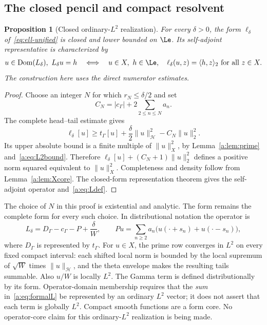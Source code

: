 \documentclass[11pt,a4paper]{article}
\numberwithin{equation}{section}
\newtheorem{proposition}[theorem]{Proposition}
\theoremstyle{definition}\newtheorem{definition}[theorem]{Definition}
\theoremstyle{remark}\newtheorem{remark}[theorem]{Remark}
\newcommand{\Hh}{\mathcal H}\newcommand{\Hw}{\mathcal H}
\newcommand{\tg}{t_\Gamma}\newcommand{\cg}{c_\Gamma}
\newcommand{\dom}{\operatorname{Dom}}\newcommand{\Var}{\operatorname{Var}}
\newcommand{\ip}[2]{\langle#1,#2\rangle}\newcommand{\norm}[1]{\lVert#1\rVert}\newcommand{\abs}[1]{\lvert#1\rvert}
\begin{document}
\subsection{The closed pencil and compact resolvent}\label{a:sec:pencil}

\begin{proposition}[Closed ordinary-$L^2$ realization]\label{a:prop:closedpencil}
For every $\delta>0$, the form $\ell_\delta$ of~\eqref{eq:ell-unified} is closed and lower bounded on $\Le$. Its self-adjoint representative is characterized by
\begin{equation}\label{a:eq:Ldef}
 \begin{split}
 u\in\dom(L_\delta),\ L_\delta u=h\quad\Longleftrightarrow\quad
 u\in X,\ h\in\Le,\quad
 \ell_\delta(u,z)=\ip{h}{z}_2\ \text{for all }z\in X.
 \end{split}
\end{equation}
The construction here uses the direct numerator estimates.
\end{proposition}
\begin{proof}
Choose an integer $N$ for which $r_N\le\delta/2$ and set
\[
 C_N=|\cg|+2\sum_{2\le n\le N}a_n.
\]
The complete head--tail estimate gives
\begin{equation}\label{a:eq:coercive}
 \ell_\delta[u]\ge\tg[u]+\frac\delta2\norm{u}_{\Hh}^2-C_N\norm{u}_2^2.
\end{equation}
Its upper absolute bound is a finite multiple of $\norm{u}_X^2$, by Lemma~\ref{a:lem:prime} and~\eqref{a:eq:L2bound}. Therefore
$\ell_\delta[u]+(C_N+1)\norm{u}_2^2$ defines a positive norm squared equivalent to $\norm{u}_X^2$. Completeness and density follow from Lemma~\ref{a:lem:Xcore}. The closed-form representation theorem gives the self-adjoint operator and~\eqref{a:eq:Ldef}.
\end{proof}

The choice of $N$ in this proof is existential and analytic. The form remains the complete form for every such choice. In distributional notation the operator is
\begin{equation}\label{a:eq:formalL}
 L_\delta=D_\Gamma-\cg-P+\frac\delta W,
 \qquad
 Pu=\sum_{n\ge2}a_n\bigl(u(\cdot+s_n)+u(\cdot-s_n)\bigr),
\end{equation}
where $D_\Gamma$ is represented by $\tg$. For $u\in X$, the prime row converges in $L^2$ on every fixed compact interval: each shifted local norm is bounded by the local supremum of $\sqrt W$ times $\norm{u}_{\Hh}$, and the theta envelope makes the resulting tails summable. Also $u/W$ is locally $L^2$. The Gamma term is defined distributionally by its form. Operator-domain membership requires that the \emph{sum} in~\eqref{a:eq:formalL} be represented by an ordinary $L^2$ vector; it does not assert that each term is globally $L^2$. Compact smooth functions are a form core. No operator-core claim for this ordinary-$L^2$ realization is being made.
\end{document}
